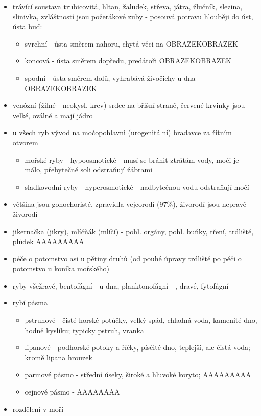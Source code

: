 \documentclass{article}
\begin{document}
\begin{itemize}
  \item trávící soustava trubicovitá, hltan, žaludek, střeva, játra, žlučník, slezina, slinivka, zvláštností jsou požerákové zuby - posouvá potravu hlouběji do úst, ústa buď:
  \begin{itemize}
    \item svrchní - ústa směrem nahoru, chytá věci na  OBRAZEKOBRAZEK
    \item koncová - ústa směrem dopředu, predátoři OBRAZEKOBRAZEK
    \item spodní - ústa směrem dolů, vyhrabává živočichy u dna OBRAZEKOBRAZEK
  \end{itemize}
  \item venózní (žilné - neokysl. krev) srdce na břišní straně, červené krvinky jsou velké, oválné a mají jádro
  \item u všech ryb vývod na močopohlavni (urogenitální) bradavce za řitním otvorem
  \begin{itemize}
    \item mořské ryby - hypoosmotické - musí se bránit ztrátám vody, moči je málo, přebytečné soli odstraňují žábrami
    \item sladkovodní ryby - hyperosmotické - nadbytečnou vodu odstraňují močí
  \end{itemize}
  \item většina jsou gonochoristé, zpravidla vejcorodí (97\%), živorodí jsou nepravě živorodí
  \item jikernačka (jikry), mlíčňák (mlíčí) - pohl. orgány, pohl. buňky, tření, trdliště, plůdek AAAAAAAAA
  \item péče o potomstvo asi u pětiny druhů (od pouhé úpravy trdliště po péči o potomstvo u koníka mořského)
  \item ryby všežravé, bentofágní - u dna, planktonofágní -  , dravé, fytofágní - 
  \item rybí pásma
  \begin{itemize}
    \item pstruhové - čisté horské potůčky, velký spád, chladná voda, kamenité dno, hodně kyslíku; typicky pstruh, vranka
    \item lipanové - podhorské potoky a říčky, písčité dno, teplejší, ale čistá voda; kromě lipana hrouzek
    \item parmové pásmo - střední úseky, široké a hluvoké koryto; AAAAAAAAA
    \item cejnové pásmo - AAAAAAAA
  \end{itemize}
  \item rozdělení v moři

\end{itemize}
\end{document}
